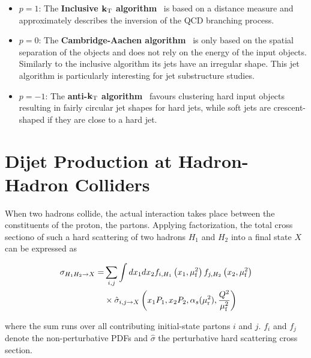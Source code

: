 \begin{itemize}
    \item $p=1$: The \textbf{Inclusive $\mathbf{k_{\mathrm{T}}}$
    algorithm}~\cite{Catani:1991hj,Catani:1992rm} is based on a \ptsq
        distance measure and approximately describes the inversion
        of the QCD branching process.
    \item $p=0$: The \textbf{Cambridge-Aachen
        algorithm}~\cite{Dokshitzer:1997in} is only based on the
        spatial separation of the objects and does not rely on the energy of
        the input objects. Similarly to the inclusive \kt algorithm its jets
        have an irregular shape. This jet algorithm is particularly interesting
        for jet substructure studies.
    \item  $p=-1$: The \textbf{anti-$\mathbf{k_{\mathrm{T}}}$ algorithm}~\cite{Cacciari:2008gp} favours clustering hard input
        objects resulting in fairly circular jet shapes for hard jets, while
        soft jets are crescent-shaped if they are close to a hard jet.
\end{itemize}

\section{Dijet Production at Hadron-Hadron Colliders}

When two hadrons collide, the actual interaction takes place between the
constituents of the proton, the partons. Applying factorization, the total cross
sectiono of such a hard scattering of two hadrons $H_1$ and $H_2$ into a final
state $X$ can be expressed as

\begin{equation*}
    \begin{split}
    \sigma_{H_1 H_2 \rightarrow X} = &\sum_{i,j} \int dx_1 dx_2 f_{i, H_1}
    \left(x_1, \mu_{\mathrm{f}}^2 \right) f_{j,H_2} \left(x_2, \mu_{\mathrm{f}}^2 \right) \\ 
    &\times \hat\sigma_{i,j \rightarrow X} \left( x_1 P_1, x_2P_2, \alpha_{s}(\mu_{\mathrm{r}}^2),
    \frac{Q^2}{\mu_{\mathrm{f}}^2} \right)
\end{split}
\end{equation*}

where the sum runs over all contributing initial-state partons $i$ and $j$.
$f_{i}$ and $f_{j}$ denote the non-perturbative PDFs and $\hat \sigma $ the
perturbative hard scattering cross section.

